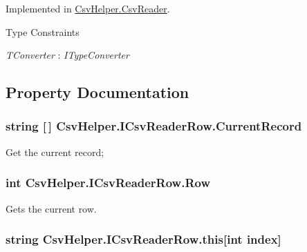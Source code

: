 Implemented in \hyperlink{a00057_a6665d63535ab6ca768ffbc76c1347e58}{Csv\-Helper.\-Csv\-Reader}.

\begin{Desc}
\item[Type Constraints]\begin{description}
\item[{\em T\-Converter} : {\em I\-Type\-Converter}]\end{description}
\end{Desc}


\subsection{Property Documentation}
\hypertarget{a00091_a4e8958e51331591b1d9e811e32bd92d0}{
\subsubsection[{Current\-Record}]{\setlength{\rightskip}{0pt plus 5cm}string \mbox{[}$\,$\mbox{]} Csv\-Helper.\-I\-Csv\-Reader\-Row.\-Current\-Record\hspace{0.3cm}{\ttfamily [get]}}}\label{a00091_a4e8958e51331591b1d9e811e32bd92d0}


Get the current record; 

\hypertarget{a00091_ac1bd960358282c70f0b85de90f00b446}{
\subsubsection[{Row}]{\setlength{\rightskip}{0pt plus 5cm}int Csv\-Helper.\-I\-Csv\-Reader\-Row.\-Row\hspace{0.3cm}{\ttfamily [get]}}}\label{a00091_ac1bd960358282c70f0b85de90f00b446}


Gets the current row. 

\hypertarget{a00091_a45d5b14c7382418d90b4c085c2bdc7dc}{
\subsubsection[{this[int index]}]{\setlength{\rightskip}{0pt plus 5cm}string Csv\-Helper.\-I\-Csv\-Reader\-Row.\-this\mbox{[}int index\mbox{]}\hspace{0.3cm}{\ttfamily [get]}}}\label{a00091_a45d5b14c7382418d90b4c085c2bdc7dc}


